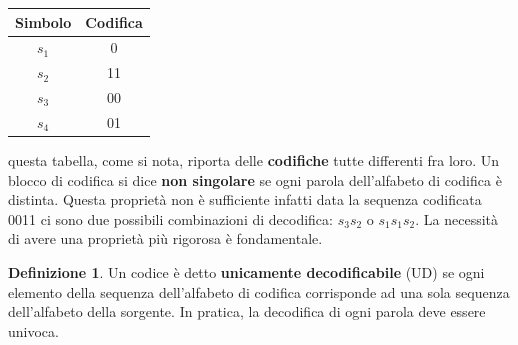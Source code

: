 \documentclass{article}
\theoremstyle{definition}
\newtheorem{definizione}{Definizione}[section]
\numberwithin{equation}{section}
\begin{document}
\begin{table}[htpb]
    \centering
    \begin{tabular}{|c|c|}
        \hline
        \textbf{Simbolo} & \textbf{Codifica} \\ \hline
        $s_1$            & 0                 \\ \hline
        $s_2$            & 11                \\ \hline
        $s_3$            & 00                \\ \hline
        $s_4$            & 01                \\ \hline
    \end{tabular}
\end{table}
questa tabella, come si nota, riporta delle \textbf{codifiche} tutte differenti fra loro. Un blocco di codifica si dice \textbf{non singolare} se ogni parola dell'alfabeto di codifica è distinta. Questa proprietà non è sufficiente infatti data la sequenza codificata 0011 ci sono due possibili combinazioni di decodifica: $s_3s_2$ o $s_1s_1s_2$. La necessità di avere una proprietà più rigorosa è fondamentale.
\begin{definizione}
    Un codice è detto \textbf{unicamente decodificabile} (UD) se ogni elemento della sequenza dell'alfabeto di codifica corrisponde ad una sola sequenza dell'alfabeto della sorgente. In pratica, la decodifica di ogni parola deve essere univoca.
\end{definizione}
\end{document}
